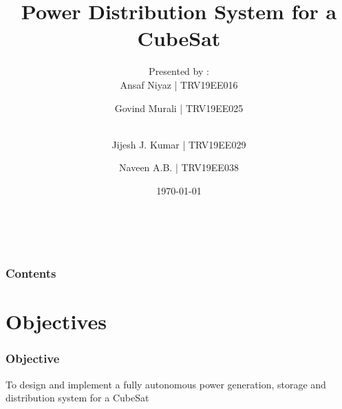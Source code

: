 \documentclass[aspectratio=169]{beamer}
\begin{document}
	\title{Power Distribution System for a CubeSat}
	
	\subtitle{}
	
	
	\author{Presented by :\\Ansaf Niyaz | TRV19EE016  \and Govind Murali | TRV19EE025  \and \\Jijesh J. Kumar | TRV19EE029  \and Naveen A.B. | TRV19EE038}
	
	\date{\today}
	
	
	{%
		\hbox{%
			\hbox{\insertslidenavigationsymbol}
			\hbox{\insertframenavigationsymbol}
			\hbox{\insertsubsectionnavigationsymbol}
			\hbox{\insertsectionnavigationsymbol}
			\hbox{\insertdocnavigationsymbol}
			\hbox{\insertbackfindforwardnavigationsymbol}}%
	}
	\begin{frame}[plain]
		\maketitle
	\end{frame}
	
	
	\begin{frame}
		\frametitle{Contents}
		
		
		
		
		\tableofcontents
	\end{frame}
	
	
	
	\section{Objectives}
	\begin{frame}
		
		\frametitle{Objective}
		\centering
		To design and implement a fully autonomous power generation, storage and distribution system for a CubeSat 
		
		
		
	\end{frame}
	
	
	
	
	
	
			
\end{document}
